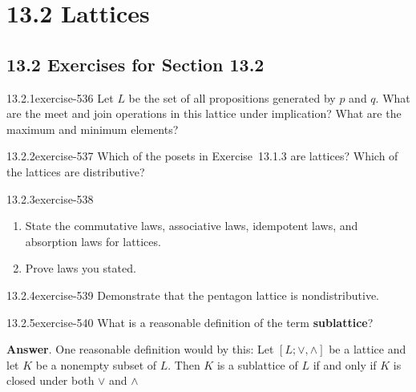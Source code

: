 \documentclass[twoside,10pt,]{book}
\newcommand{\terminology}[1]{\textbf{#1}}
\numberwithin{equation}{section}
\begin{document}
\section*{13.2 Lattices}
\subsection*{13.2 Exercises for Section 13.2}
\begin{divisionsolution}{13.2.1}{}{exercise-536}%
\hypertarget{p-4839}{}%
Let \(L\) be the set of all propositions generated by \(p\) and \(q\).  What are the meet and join operations in this lattice under implication?   What are the maximum and minimum elements?%
\end{divisionsolution}%
\begin{divisionsolution}{13.2.2}{}{exercise-537}%
\hypertarget{p-4840}{}%
Which of the posets in Exercise~13.1.3 are lattices? Which of the lattices are distributive?%
\end{divisionsolution}%
\begin{divisionsolution}{13.2.3}{}{exercise-538}%
\hypertarget{p-4841}{}%
\leavevmode%
\begin{enumerate}[label=(\alph*)]
\item\hypertarget{li-2209}{}\hypertarget{p-4842}{}%
State the commutative laws, associative laws, idempotent laws, and absorption laws for lattices.%
\item\hypertarget{li-2210}{}\hypertarget{p-4843}{}%
Prove laws you stated.%
\end{enumerate}
%
\end{divisionsolution}%
\begin{divisionsolution}{13.2.4}{}{exercise-539}%
\hypertarget{p-4844}{}%
Demonstrate that the pentagon lattice is nondistributive.%
\end{divisionsolution}%
\begin{divisionsolution}{13.2.5}{}{exercise-540}%
\hypertarget{p-4845}{}%
What is a reasonable definition of the term \terminology{sublattice}?%
\par\smallskip%
\noindent\textbf{Answer}.\quad%
\hypertarget{p-4846}{}%
One reasonable definition would by this:  Let \([L; \lor, \land ]\) be a lattice and let \(K\) be a nonempty subset of \(L\).  Then \(K\) is a sublattice of \(L\) if and only if \(K\) is closed under both \(\lor\) and \(\land\)%
\end{divisionsolution}%
\end{document}
